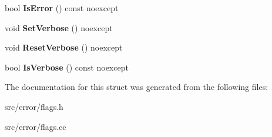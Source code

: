 \begin{DoxyCompactItemize}
\item 
\hypertarget{structae_1_1error_1_1_flags_af9751a6f34f4a83bbe402d97e9af646d}{}\label{structae_1_1error_1_1_flags_af9751a6f34f4a83bbe402d97e9af646d} 
bool {\bfseries Is\+Error} () const noexcept
\item 
\hypertarget{structae_1_1error_1_1_flags_aa80a0e830d0f0a390c5c8158b909fc29}{}\label{structae_1_1error_1_1_flags_aa80a0e830d0f0a390c5c8158b909fc29} 
void {\bfseries Set\+Verbose} () noexcept
\item 
\hypertarget{structae_1_1error_1_1_flags_a32b80335f90ce234cf1d1d172e3c30a5}{}\label{structae_1_1error_1_1_flags_a32b80335f90ce234cf1d1d172e3c30a5} 
void {\bfseries Reset\+Verbose} () noexcept
\item 
\hypertarget{structae_1_1error_1_1_flags_ab47c8ae55803bbca67c8328ca2ca44bc}{}\label{structae_1_1error_1_1_flags_ab47c8ae55803bbca67c8328ca2ca44bc} 
bool {\bfseries Is\+Verbose} () const noexcept
\end{DoxyCompactItemize}


The documentation for this struct was generated from the following files\+:\begin{DoxyCompactItemize}
\item 
src/error/flags.\+h\item 
src/error/flags.\+cc\end{DoxyCompactItemize}
